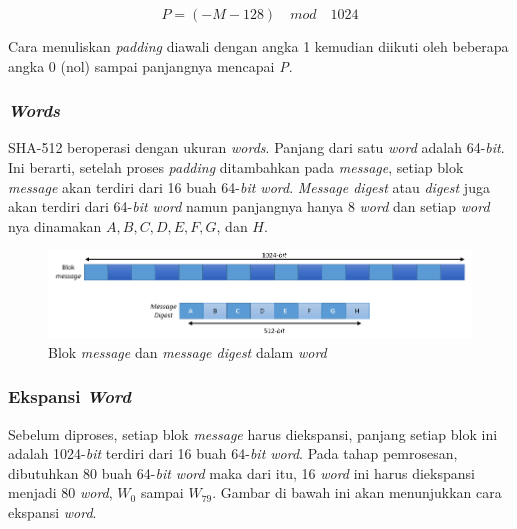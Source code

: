 \begin{displaymath}
	P = (-M - 128)\quad mod\quad 1024
\end{displaymath}

Cara menuliskan \textit{padding} diawali dengan angka 1 kemudian diikuti oleh beberapa angka 0 (nol) sampai panjangnya mencapai \textit{P}.

\subsubsection{\textit{Words}}
SHA-512 beroperasi dengan ukuran \textit{words}. Panjang dari satu \textit{word} adalah 64-\textit{bit}. Ini berarti, setelah proses \textit{padding} ditambahkan pada \textit{message}, setiap blok \textit{message} akan terdiri dari 16 buah 64-\textit{bit word}. \textit{Message digest} atau \textit{digest} juga akan terdiri dari 64-\textit{bit word} namun panjangnya hanya 8 \textit{word} dan setiap \textit{word} nya dinamakan \begin{math}A, B, C, D, E, F, G\end{math}, dan \begin{math}H\end{math}.

\begin{figure}[ht]
	\includegraphics[scale=0.6]{Gambar/message_block_digest_as_words}
	\centering
	\caption{Blok \textit{message} dan \textit{message digest} dalam \textit{word}}
\end{figure}

\subsubsection{Ekspansi \textit{Word}}
\label{sssec:ekspansi_word}
Sebelum diproses, setiap blok \textit{message} harus diekspansi, panjang setiap blok ini adalah 1024-\textit{bit} terdiri dari 16 buah 64-\textit{bit word}. Pada tahap pemrosesan, dibutuhkan 80 buah 64-\textit{bit word} maka dari itu, 16 \textit{word} ini harus diekspansi menjadi 80 \textit{word}, \begin{math}W_0\end{math} sampai \begin{math}W_79\end{math}. Gambar di bawah ini akan menunjukkan cara ekspansi \textit{word}.

